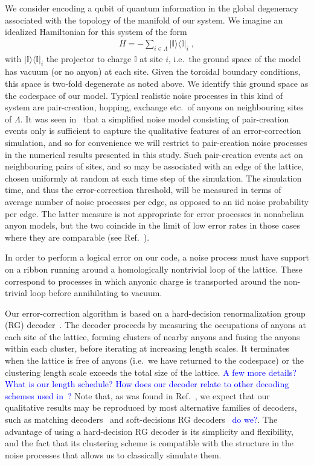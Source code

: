 \documentclass[aps, prl, letterpaper, twocolumn, superscriptaddress, notitlepage, 10pt]{revtex4-1}
\newcommand{\ket}[1]{|{#1}\rangle}
\newcommand{\bra}[1]{\langle{#1}|}
\newcommand{\ketbra}[2]{\ket{#1}\!\bra{#2}}
\newcommand{\proj}[1]{\ketbra{#1}{#1}}
\newcommand{\cggb}[1]{\textcolor{blue}{#1}}
\begin{document}
We consider encoding a qubit of quantum information in the global degeneracy associated 
with the topology of the manifold of our system. We imagine an idealized Hamiltonian for this 
system of the form
\begin{align}
	H=-\sum_{i\in \Lambda}\proj{\mathbb{I}}_i\;,\label{e:hamiltonian}
\end{align}
with $\proj{\mathbb{I}}_i$ the projector to charge $\mathbb{I}$ at site $i$, i.e.~the ground 
space of the model has vacuum (or no anyon) at each site. Given the toroidal boundary 
conditions, this space is two-fold degenerate as noted above. We identify this ground space 
as the codespace of our model. Typical realistic noise processes in this kind of system are 
pair-creation, hopping, exchange etc.~of anyons on neighbouring sites of $\Lambda$. It was 
seen in~\cite{Brell2013} that a simplified noise model consisting of pair-creation events only 
is sufficient to capture the qualitative features of an error-correction simulation, and so for convenience we 
will restrict to pair-creation noise processes in the numerical results presented in this study. Such pair-creation events act 
on neighbouring pairs of sites, and so may be associated with an edge of the lattice, chosen 
uniformly at random at each time step of the simulation. The simulation time, and thus the 
error-correction threshold, will be measured in terms of average number of noise processes 
per edge, as opposed to an iid noise probability per edge. The latter measure is not 
appropriate for error processes in nonabelian anyon models, but the two coincide in the limit 
of low error rates in those cases where they are comparable (see Ref.~\cite{Brell2013}).

In order to perform a logical error on our code, a noise process must have support on a 
ribbon running around a homologically nontrivial loop of the lattice. These correspond to 
processes in which anyonic charge is transported around the non-trivial loop before 
annihilating to vacuum.

Our error-correction algorithm is based on a hard-decision renormalization group (RG) 
decoder~\cite{Bravyi2011}. The decoder proceeds by measuring the occupations of 
anyons at each site of the lattice, forming clusters of nearby anyons and fusing the anyons 
within each cluster, before iterating at increasing length scales. It terminates when the lattice 
is free of anyons (i.e.~we have returned to the codespace) or the clustering length scale 
exceeds the total size of the lattice. \cggb{A few more details? What is our length schedule?} 
\cggb{How does our decoder relate to other decoding schemes used in~\cite{Wootton2013,Brell2013,Hutter2014}?} 
Note that, as was found in Ref.~\cite{Brell2013}, we expect that our qualitative results may be reproduced by most alternative families of decoders, such as matching decoders~\cite{?} and soft-decisions 
RG decoders~\cite{?} \cggb{do we?}. The advantage of using a hard-decision RG decoder is 
its simplicity and flexibility, and the fact that its clustering scheme is compatible with the structure in the noise processes that allows us to classically simulate them.
\end{document}
